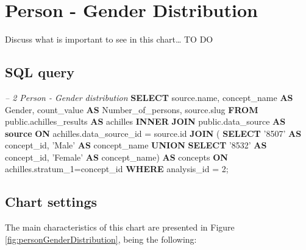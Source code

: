 \documentclass[]{book}
\newenvironment{Shaded}{\begin{snugshade}}{\end{snugshade}}
\newcommand{\KeywordTok}[1]{\textcolor[rgb]{0.13,0.29,0.53}{\textbf{#1}}}
\newcommand{\DecValTok}[1]{\textcolor[rgb]{0.00,0.00,0.81}{#1}}
\newcommand{\StringTok}[1]{\textcolor[rgb]{0.31,0.60,0.02}{#1}}
\newcommand{\CommentTok}[1]{\textcolor[rgb]{0.56,0.35,0.01}{\textit{#1}}}
\newcommand{\NormalTok}[1]{#1}
\begin{document}
\section{Person - Gender
Distribution}\label{person---gender-distribution}

Discuss what is important to see in this chart\ldots{} TO DO

\subsection{SQL query}\label{sql-query-9}

\begin{Shaded}
\begin{Highlighting}[]
\CommentTok{-- 2  Person - Gender distribution}
\KeywordTok{SELECT}\NormalTok{ source.name,}
\NormalTok{       concept_name }\KeywordTok{AS}\NormalTok{ Gender, }
\NormalTok{       count_value }\KeywordTok{AS}\NormalTok{ Number_of_persons,}
\NormalTok{       source.slug}
\KeywordTok{FROM}\NormalTok{ public.achilles_results }\KeywordTok{AS}\NormalTok{ achilles }\KeywordTok{INNER} \KeywordTok{JOIN} 
\NormalTok{      public.data_source }\KeywordTok{AS} \KeywordTok{source} \KeywordTok{ON} 
\NormalTok{    achilles.data_source_id = source.id}
    \KeywordTok{JOIN}\NormalTok{ (}
        \KeywordTok{SELECT} \StringTok{'8507'} \KeywordTok{AS}\NormalTok{ concept_id, }\StringTok{'Male'} \KeywordTok{AS}\NormalTok{ concept_name }\KeywordTok{UNION} 
        \KeywordTok{SELECT} \StringTok{'8532'} \KeywordTok{AS}\NormalTok{ concept_id, }\StringTok{'Female'} \KeywordTok{AS}\NormalTok{ concept_name) }\KeywordTok{AS} 
\NormalTok{        concepts }\KeywordTok{ON}\NormalTok{ achilles.stratum_1=concept_id}
\KeywordTok{WHERE}\NormalTok{ analysis_id = }\DecValTok{2}\NormalTok{;}
\end{Highlighting}
\end{Shaded}

\subsection{Chart settings}\label{chart-settings-9}

The main characteristics of this chart are presented in Figure
\ref{fig:personGenderDistribution}, being the following:
\end{document}
